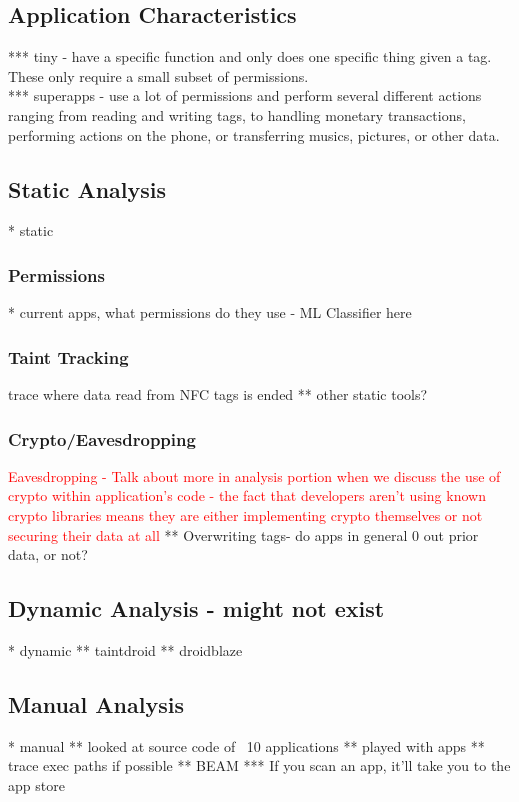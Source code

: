 \documentclass[12pt]{article}
\newcommand\TODO[1]{\textcolor{red}{#1}}
\begin{document}
\subsection{Application Characteristics}
*** tiny - have a specific function and only does one specific thing given a tag. These only require a small subset of permissions. 
\\
*** superapps - use a lot of permissions and perform several different actions ranging from reading and writing tags, to handling monetary transactions, performing actions on the phone, or transferring musics, pictures, or other data.

\subsection{Static Analysis}
* static
\subsubsection{Permissions}
* current apps, what permissions do they use - ML Classifier here
\subsubsection{Taint Tracking}
trace where data read from NFC tags is ended
** other static tools? 
\subsubsection{Crypto/Eavesdropping}
\TODO{Eavesdropping - Talk about more in analysis portion when we discuss the use of crypto within application's code - the fact that developers aren't using known crypto libraries means they are either implementing crypto themselves or not securing their data at all} 
** Overwriting tags- do apps in general 0 out prior data, or not?

\subsection{Dynamic Analysis - might not exist}
* dynamic
** taintdroid
** droidblaze

\subsection{Manual Analysis}
* manual
** looked at source code of ~10 applications
** played with apps
** trace exec paths if possible
** BEAM
*** If you scan an app, it'll take you to the app store
\end{document}
